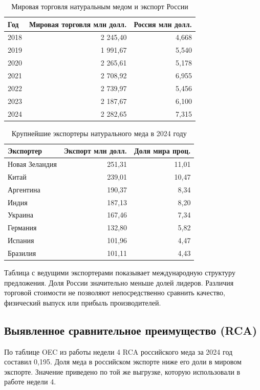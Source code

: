 \documentclass[12pt,a4paper]{article}
\begin{document}
\begin{table}[H]
\centering
\caption{Мировая торговля натуральным медом и экспорт России}\label{tab:years}
{\small
\begin{tabular}{lrr}
\toprule
Год & Мировая торговля млн долл. & Россия млн долл. \\ \midrule
2018 & 2 245,40 & 4,668 \\
2019 & 1 991,67 & 5,540 \\
2020 & 2 265,61 & 5,178 \\
2021 & 2 708,92 & 6,955 \\
2022 & 2 739,97 & 5,456 \\
2023 & 2 187,67 & 6,100 \\
2024 & 2 282,65 & 7,315 \\
\bottomrule
\end{tabular}}
\par{}
\end{table}
\begin{table}[H]
\centering
\caption{Крупнейшие экспортеры натурального меда в 2024 году}\label{tab:exporters}
{\small
\begin{tabular}{lrr}
\toprule
Экспортер & Экспорт млн долл. & Доля мира проц. \\ \midrule
Новая Зеландия & 251,31 & 11,01 \\
Китай & 239,01 & 10,47 \\
Аргентина & 190,37 & 8,34 \\
Индия & 187,13 & 8,20 \\
Украина & 167,46 & 7,34 \\
Германия & 132,80 & 5,82 \\
Испания & 101,96 & 4,47 \\
Бразилия & 101,11 & 4,43 \\
\bottomrule
\end{tabular}}
\par{}
\end{table}
Таблица с ведущими экспортерами показывает международную структуру предложения. Доля России значительно меньше долей лидеров. Различия торговой стоимости не позволяют непосредственно сравнить качество, физический выпуск или прибыль производителей.

\subsection{Выявленное сравнительное преимущество (RCA)}
По таблице OEC из работы недели 4 RCA российского меда за 2024 год составил 0,195. Доля меда в российском экспорте ниже его доли в мировом экспорте. Значение приведено по той же выгрузке, которую использовали в работе недели 4.
\end{document}
